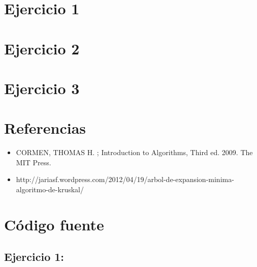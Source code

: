 \documentclass[10pt, a4paper]{article}
\begin{document}
\section{Ejercicio 1}

\newpage

\section{Ejercicio 2}

\newpage

\section{Ejercicio 3}

\newpage


\section{Referencias}
\begin{itemize}
\item CORMEN, THOMAS H. ; Introduction to Algorithms, Third ed. 2009. The MIT Press.
\item http://jariasf.wordpress.com/2012/04/19/arbol-de-expansion-minima-algoritmo-de-kruskal/
\end{itemize}


\section{Código fuente}

\subsection{Ejercicio 1:}
\end{document}
